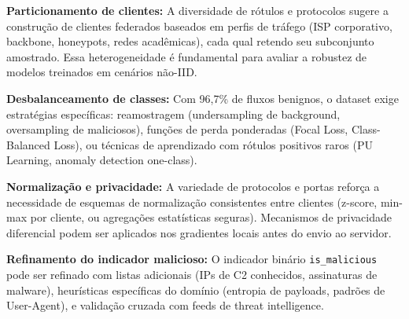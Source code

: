 \documentclass[a4paper, 12pt]{article}
\begin{document}
\begin{compactitem}
    \item \textbf{Particionamento de clientes:} A diversidade de rótulos e protocolos sugere a construção de clientes federados baseados em perfis de tráfego (ISP corporativo, backbone, honeypots, redes acadêmicas), cada qual retendo seu subconjunto amostrado. Essa heterogeneidade é fundamental para avaliar a robustez de modelos treinados em cenários não-IID.
    
    \item \textbf{Desbalanceamento de classes:} Com 96{,}7\% de fluxos benignos, o dataset exige estratégias específicas: reamostragem (undersampling de background, oversampling de maliciosos), funções de perda ponderadas (Focal Loss, Class-Balanced Loss), ou técnicas de aprendizado com rótulos positivos raros (PU Learning, anomaly detection one-class).
    
    \item \textbf{Normalização e privacidade:} A variedade de protocolos e portas reforça a necessidade de esquemas de normalização consistentes entre clientes (z-score, min-max por cliente, ou agregações estatísticas seguras). Mecanismos de privacidade diferencial podem ser aplicados nos gradientes locais antes do envio ao servidor.
    
    \item \textbf{Refinamento do indicador malicioso:} O indicador binário \texttt{is\_malicious} pode ser refinado com listas adicionais (IPs de C2 conhecidos, assinaturas de malware), heurísticas específicas do domínio (entropia de payloads, padrões de User-Agent), e validação cruzada com feeds de threat intelligence.
\end{compactitem}
\end{document}

